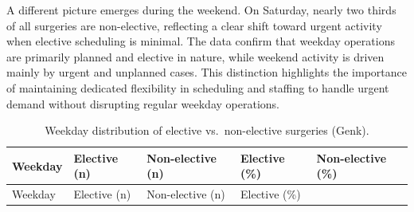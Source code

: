 \documentclass[
]{article}
\begin{document}
A different picture emerges during the weekend. On Saturday, nearly two
thirds of all surgeries are non-elective, reflecting a clear shift
toward urgent activity when elective scheduling is minimal. The data
confirm that weekday operations are primarily planned and elective in
nature, while weekend activity is driven mainly by urgent and unplanned
cases. This distinction highlights the importance of maintaining
dedicated flexibility in scheduling and staffing to handle urgent demand
without disrupting regular weekday operations.

\begin{longtable}[]{@{}
  >{\centering\arraybackslash}p{}
  >{\centering\arraybackslash}p{}
  >{\centering\arraybackslash}p{}
  >{\centering\arraybackslash}p{}
  >{\centering\arraybackslash}p{}@{}}
\caption{Weekday distribution of elective vs.~non-elective surgeries
(Genk). \label{tab:urgency_wd}}\tabularnewline
\toprule\noalign{}
\begin{minipage}[b]{\linewidth}\centering
Weekday
\end{minipage} & \begin{minipage}[b]{\linewidth}\centering
Elective (n)
\end{minipage} & \begin{minipage}[b]{\linewidth}\centering
Non-elective (n)
\end{minipage} & \begin{minipage}[b]{\linewidth}\centering
Elective (\%)
\end{minipage} & \begin{minipage}[b]{\linewidth}\centering
Non-elective (\%)
\end{minipage} \\
\midrule\noalign{}
\endfirsthead
\toprule\noalign{}
\begin{minipage}[b]{\linewidth}\centering
Weekday
\end{minipage} & \begin{minipage}[b]{\linewidth}\centering
Elective (n)
\end{minipage} & \begin{minipage}[b]{\linewidth}\centering
Non-elective (n)
\end{minipage} & \begin{minipage}[b]{\linewidth}\centering
Elective (\%)
\end{minipage} & \begin{minipage}[b]{\linewidth}\centering

\end{minipage}
\end{longtable}
\end{document}
